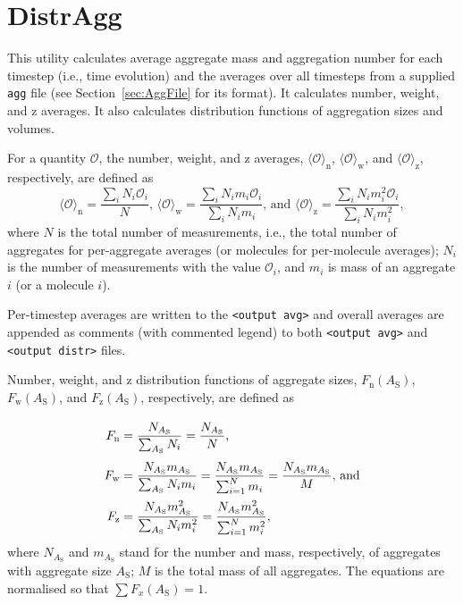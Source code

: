\section{DistrAgg} \label{sec:DistrAgg}

This utility calculates average aggregate mass and aggregation number for
each timestep (i.e., time evolution) and the averages over all timesteps
from a supplied \texttt{agg} file (see Section~\ref{sec:AggFile} for its format).
It calculates number, weight, and z averages. It also calculates
distribution functions of aggregation sizes and volumes.

For a quantity $\mathcal{O}$, the number, weight, and z averages,
$\langle\mathcal{O}\rangle_{\text{n}}$,
$\langle\mathcal{O}\rangle_{\text{w}}$, and
$\langle\mathcal{O}\rangle_{\text{z}}$, respectively, are defined as
\begin{equation} \label{eq:Avg}
  \langle\mathcal{O}\rangle_{\text{n}} = \frac{\sum_i N_i\mathcal{O}_i     }{N}
  \mbox{, \ \ \ }
  \langle\mathcal{O}\rangle_{\text{w}} = \frac{\sum_i N_im_i\mathcal{O}_i  }{\sum_i N_i m_i}
  \mbox{, and \ \ \ }
  \langle\mathcal{O}\rangle_{\text{z}} = \frac{\sum_i N_im_i^2\mathcal{O}_i}{\sum_i N_i m_i^2},
\end{equation}
where $N$ is the total number of measurements, i.e., the total number of
aggregates for per-aggregate averages (or molecules for per-molecule
averages); $N_i$ is the number of measurements with the value
$\mathcal{O}_i$, and $m_i$ is mass of an aggregate $i$ (or a molecule $i$).

Per-timestep averages are written to the \texttt{<output avg>} and overall
averages are appended as comments (with commented legend) to both
\texttt{<output avg>} and \texttt{<output distr>} files.

Number, weight, and z distribution functions of aggregate sizes,
$F_{\text{n}}(A_{\text{S}})$, $F_{\text{w}}(A_{\text{S}})$, and
$F_{\text{z}}(A_{\text{S}})$, respectively, are defined as
\begin{equation} \label{eq:Fnwz}
  \arraycolsep=1.4pt\def\arraystretch{2.5}
  \begin{array}{>{\displaystyle}rc>{\displaystyle}l}
    F_{\text{n}} & = & \frac{N_{A_{\text{S}} }}{\sum_{A_{\text{S}} } N_i} =
    \frac{N_{A_{\text{S}} }}{N}
  \mbox{,} \\
    F_{\text{w}} & = & \frac{N_{A_{\text{S}} } m_{A_{\text{S}} }}{\sum_{A_{\text{S}} } N_i m_i} =
    \frac{N_{A_{\text{S}} } m_{A_{\text{S}} }}{\sum_{i=1}^N m_i} =
    \frac{N_{A_{\text{S}} } m_{A_{\text{S}} }}{M}
  \mbox{, and} \\
    F_{\text{z}} & = & \frac{N_{A_{\text{S}} } m^2_{A_{\text{S}}
    }}{\sum_{A_{\text{S}} } N_i m_i^2} =
    \frac{N_{A_{\text{S}} } m^2_{A_{\text{S}} }}{\sum_{i=1}^N m_i^2}, \\
  \end{array}
\end{equation}
where $N_{A_{\text{S}}}$ and $m_{A_{\text{S}}}$ stand for the number
and mass, respectively, of aggregates with aggregate size $A_{\text{S}}$;
$M$ is the total mass of all aggregates. The equations are normalised so
that $\sum F_x(A_{\text{S}})=1$.

